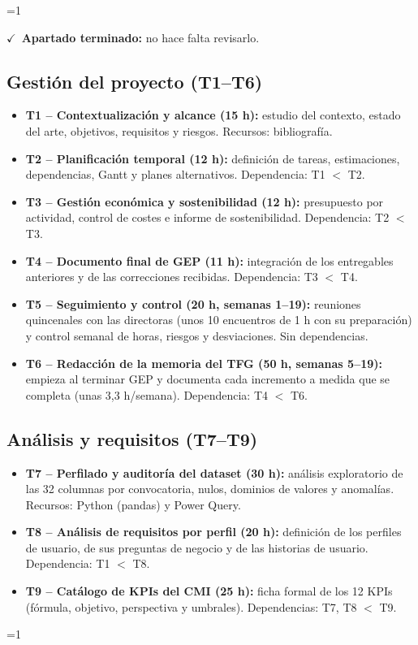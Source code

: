 \documentclass[12pt, a4paper, oneside]{report}
\newcommand{\mostrarterminados}{1}
\newenvironment{revisado}
  {\ifnum\mostrarterminados=1\relax\begin{cajarevisada}\noindent\colorbox{verdeterminado}{\parbox{\dimexpr\linewidth-2\fboxsep\relax}{\small$\checkmark$\ \textbf{Apartado terminado:} no hace falta revisarlo.}}\par\medskip\fi}
  {\ifnum\mostrarterminados=1\relax\end{cajarevisada}\fi}
\begin{document}
\begin{revisado}
\subsection{Gestión del proyecto (T1--T6)}
\begin{itemize}
    \item \textbf{T1 -- Contextualización y alcance (15 h):} estudio del contexto, estado del arte, objetivos, requisitos y riesgos. Recursos: bibliografía.
    \item \textbf{T2 -- Planificación temporal (12 h):} definición de tareas, estimaciones, dependencias, Gantt y planes alternativos. Dependencia: T1 $<$ T2.
    \item \textbf{T3 -- Gestión económica y sostenibilidad (12 h):} presupuesto por actividad, control de costes e informe de sostenibilidad. Dependencia: T2 $<$ T3.
    \item \textbf{T4 -- Documento final de GEP (11 h):} integración de los entregables anteriores y de las correcciones recibidas. Dependencia: T3 $<$ T4.
    \item \textbf{T5 -- Seguimiento y control (20 h, semanas 1--19):} reuniones quincenales con las directoras (unos 10 encuentros de 1 h con su preparación) y control semanal de horas, riesgos y desviaciones. Sin dependencias.
    \item \textbf{T6 -- Redacción de la memoria del TFG (50 h, semanas 5--19):} empieza al terminar GEP y documenta cada incremento a medida que se completa (unas 3,3 h/semana). Dependencia: T4 $<$ T6.
\end{itemize}

\subsection{Análisis y requisitos (T7--T9)}
\begin{itemize}
    \item \textbf{T7 -- Perfilado y auditoría del dataset (30 h):} análisis exploratorio de las 32 columnas por convocatoria, nulos, dominios de valores y anomalías. Recursos: Python (pandas) y Power Query.
    \item \textbf{T8 -- Análisis de requisitos por perfil (20 h):} definición de los perfiles de usuario, de sus preguntas de negocio y de las historias de usuario. Dependencia: T1 $<$ T8.
    \item \textbf{T9 -- Catálogo de KPIs del CMI (25 h):} ficha formal de los 12 KPIs (fórmula, objetivo, perspectiva y umbrales). Dependencias: T7, T8 $<$ T9.
\end{itemize}


\end{revisado}
\end{document}
